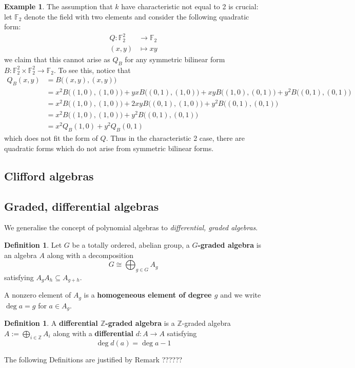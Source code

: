 \documentclass[12pt]{article}
\theoremstyle{plain}
\theoremstyle{definition}
\newtheorem{defn}[thm]{Definition} %
\newtheorem{example}[thm]{Example}
\newcommand{\bb}[1]{\mathbb{#1}}
\newcommand{\lto}{\longrightarrow}
\begin{document}
\begin{example}
The assumption that $k$ have characteristic not equal to 2 is crucial: let $\bb{F}_2$ denote the field with two elements and consider the following quadratic form:
\begin{align*}
Q: \bb{F}^2_2 &\lto \bb{F}_2\\
(x,y) &\longmapsto xy
\end{align*}
we claim that this cannot arise as $Q_B$ for any symmetric bilinear form $B: \bb{F}^2_2 \times \bb{F}^2_2 \lto \bb{F}_2$. To see this, notice that
\begin{align*}
Q_B(x,y) &= B\big((x,y),(x,y)\big)\\
&= x^2B\big((1,0),(1,0)\big) + yxB\big((0,1),(1,0)\big) + xyB\big((1,0),(0,1)\big) + y^2B\big((0,1),(0,1)\big)\\
&= x^2B\big((1,0),(1,0)\big) + 2xyB\big((0,1),(1,0)\big) + y^2B\big((0,1),(0,1)\big)\\
&= x^2B\big((1,0),(1,0)\big) + y^2B\big((0,1),(0,1)\big)\\
&= x^2Q_B(1,0) + y^2Q_B(0,1)
\end{align*}
which does not fit the form of $Q$. Thus in the characteristic 2 case, there are quadratic forms which do not arise from symmetric bilinear forms.
\end{example}
\subsection{Clifford algebras}
\subsection{Graded, differential algebras}
We generalise the concept of polynomial algebras to \emph{differential, graded algebras}.
\begin{defn}
Let $G$ be a totally ordered, abelian group, a \textbf{$G$-graded algebra} is an algebra $A$ along with a decomposition
\begin{equation}
G \cong \bigoplus_{g \in G}A_g
\end{equation}
satisfying $A_gA_{h} \subseteq A_{g+h}$.

A nonzero element of $A_g$ is a \textbf{homogeneous element of degree $g$} and we write $\operatorname{deg}a = g$ for $a \in A_g$.
\end{defn}
\begin{defn}
A \textbf{differential $\bb{Z}$-graded algebra} is a $\bb{Z}$-graded algebra $A := \bigoplus_{i \in \bb{Z}}A_i$ along with a \textbf{differential} $d: A \lto A$ satisfying
\begin{equation}
\operatorname{deg}d(a) = \operatorname{deg}a - 1
\end{equation}
\end{defn}
The following Definitions are justified by Remark ??????
\end{document}
